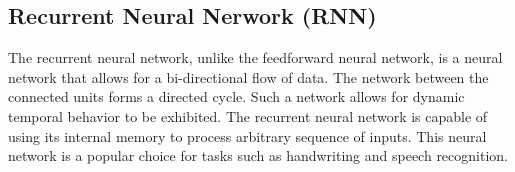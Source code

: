 \subsection{Recurrent Neural Nerwork (RNN)}
The recurrent neural network, unlike the feedforward neural network, is a neural network that allows for a bi-directional flow of data. 
The network between the connected units forms a directed cycle.
Such a network allows for dynamic temporal behavior to be exhibited.
The recurrent neural network is capable of using its internal memory to process arbitrary sequence of inputs.
This neural network is a popular choice for tasks such as handwriting and speech recognition.

